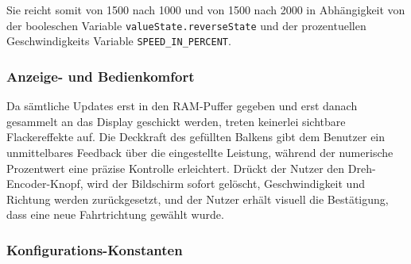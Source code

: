 \documentclass[a4paper,12pt]{article}
\begin{document}
Sie reicht somit von 1500 nach 1000 und von 1500 nach 2000 in Abhängigkeit von der booleschen Variable \texttt{valueState.reverseState} und der prozentuellen Geschwindigkeits Variable \texttt{SPEED\_IN\_PERCENT}.


\subsubsection{Anzeige- und Bedienkomfort}
Da sämtliche Updates erst in den RAM-Puffer gegeben und erst danach gesammelt an das Display geschickt werden, treten keinerlei sichtbare Flackereffekte auf. Die Deckkraft des gefüllten Balkens gibt dem Benutzer ein unmittelbares Feedback über die eingestellte Leistung, während der numerische Prozentwert eine präzise Kontrolle erleichtert. Drückt der Nutzer den Dreh-Encoder-Knopf, wird der Bildschirm sofort gelöscht, Geschwindigkeit und Richtung werden zurückgesetzt, und der Nutzer erhält visuell die Bestätigung, dass eine neue Fahrtrichtung gewählt wurde.

\subsubsection{Konfigurations-Konstanten}
\end{document}
